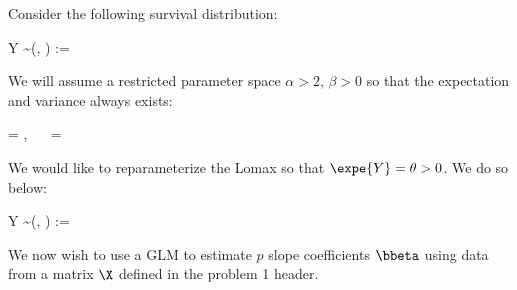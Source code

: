 \documentclass[12pt]{article}
\begin{document}
\problem Consider the following survival distribution:

\beqn
Y \sim {}(\alpha, \beta) := \frac{\alpha}{\beta}  
\eeqn

\noindent We will assume a restricted parameter space $\alpha > 2$, $\beta > 0$ so that the expectation and variance always exists:

\beqn
{} = , ~~  = 
\eeqn

\noindent We would like to reparameterize the Lomax so that $\expe{Y} = \theta > 0$. We do so below:

\beqn
Y \sim {}(\alpha, \theta) :=   
\eeqn

\noindent We now wish to use a GLM to estimate $p$ slope coefficients $\bbeta$ using data from a matrix $\X$ defined in the problem 1 header.
\end{document}
